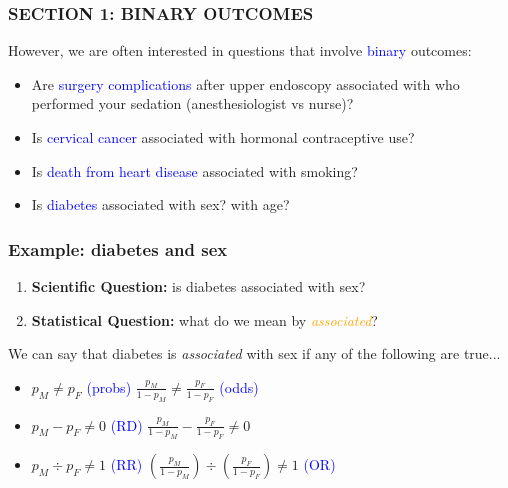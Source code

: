 \documentclass[12pt, 
hyperref={colorlinks=true, linkcolor=blue, urlcolor=cyan}]{beamer}
\begin{document}
\begin{frame}
\frametitle{SECTION 1: BINARY OUTCOMES}
However, we are often interested in questions that involve \textcolor{blue}{binary} outcomes:

\begin{itemize}
\item Are \textcolor{blue}{surgery complications} after upper endoscopy associated with who performed your sedation (anesthesiologist vs nurse)? %
\item Is \textcolor{blue}{cervical cancer} associated with hormonal contraceptive use? %
\item Is \textcolor{blue}{death from heart disease} associated with smoking?
\item Is \textcolor{blue}{diabetes} associated with sex? with age? %
\end{itemize}
\end{frame}

\begin{frame}
\frametitle{Example: diabetes and sex}

\begin{enumerate}
\item \textbf{Scientific Question:} is diabetes associated with sex?  \pause
\item \textbf{Statistical Question:} what do we mean by \textcolor{orange}{\textit{associated}}?  \pause
\end{enumerate}

We can say that diabetes is \textit{associated} with sex if any of the following are true... \pause
\begin{itemize}
\item[] $p_M \not= p_F$ \pause \textcolor{blue}{(probs)} \quad \quad \quad \quad \pause $\frac{p_M}{1-p_M} \not= \frac{p_F}{1-p_F}$ \pause \textcolor{blue}{(odds)} \pause
\item[] $p_M - p_F \not= 0$ \pause \textcolor{blue}{(RD)} \pause \quad \quad \quad $\frac{p_M}{1-p_M} - \frac{p_F}{1-p_F} \not= 0$ \pause
\item[] $p_M \div p_F \not= 1$ \pause \textcolor{blue}{(RR)} \pause \quad \quad \quad  $\left(\frac{p_M}{1-p_M}\right) \div \left(\frac{p_F}{1-p_F}\right) \not= 1$ \pause \textcolor{blue}{(OR)}
\end{itemize}
\end{frame}
\end{document}
